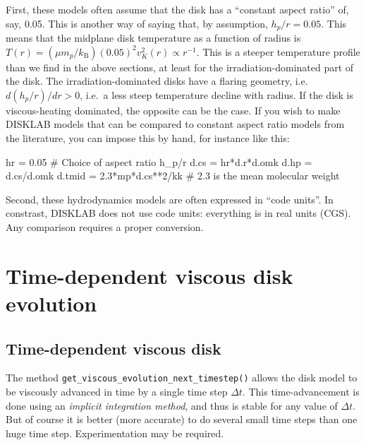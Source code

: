 \documentclass{book}
\newcommand{\code}[1]{{\small\tt #1}}
\begin{document}
First, these models often assume that the disk has a ``constant aspect ratio''
of, say, 0.05. This is another way of saying that, by assumption,
$h_p/r=0.05$. This means that the midplane disk temperature as a function of
radius is $T(r)=(\mu m_p/k_{\mathrm{B}})(0.05)^2v_K^2(r)\propto r^{-1}$. This is
a steeper temperature profile than we find in the above sections, at least for
the irradiation-dominated part of the disk. The irradiation-dominated disks have
a flaring geometry, i.e.\ $d(h_p/r)/dr>0$, i.e.~a less steep temperature decline
with radius. If the disk is viscous-heating dominated, the opposite can be the
case. If you wish to make {\sf DISKLAB} models that can be compared to
constant aspect ratio models from the literature, you can impose this by
hand, for instance like this:
\begin{codebox}
hr      = 0.05                # Choice of aspect ratio h_p/r
d.cs    = hr*d.r*d.omk
d.hp    = d.cs/d.omk
d.tmid  = 2.3*mp*d.cs**2/kk   # 2.3 is the mean molecular weight
\end{codebox}

Second, these hydrodynamics models are often expressed in ``code units''.
In constrast, {\sf DISKLAB} does not use code units: everything is in real
units (CGS). Any comparison requires a proper conversion.



\chapter{Time-dependent viscous disk evolution}

\section{Time-dependent viscous disk}
\label{sec-time-dep-visc-disk}
The method \code{get\_viscous\_evolution\_next\_timestep()} allows the disk
model to be viscously advanced in time by a single time step $\Delta t$. This
time-advancement is done using an {\em implicit integration method}, and thus is
stable for any value of $\Delta t$. But of course it is better (more accurate)
to do several small time steps than one huge time step. Experimentation may be
required.
\end{document}
